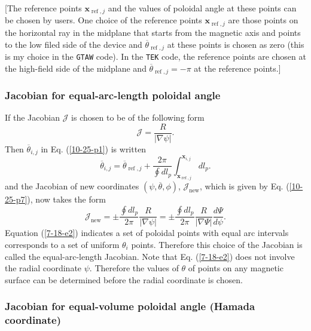 \documentclass{llncs}
\newcommand{\tmop}[1]{\ensuremath{\operatorname{#1}}}
\begin{document}
[The reference points $\mathbf{x}_{\tmop{ref}, j}$ and the values of poloidal
angle at these points can be chosen by users. One choice of the reference
points $\mathbf{x}_{\tmop{ref}, j}$ are those points on the horizontal ray in
the midplane that starts from the magnetic axis and points to the low filed
side of the device and $\overline{\theta}_{\tmop{ref}, j}$ at these points is
chosen as zero (this is my choice in the {\texttt{GTAW}} code). In the
{\texttt{TEK}} code, the reference points are chosen at the high-field side
of the midplane and $\overline{\theta}_{\tmop{ref}, j} = - \pi$ at the
reference points.]

\subsubsection{Jacobian for equal-arc-length poloidal angle}

If the Jacobian $\mathcal{J}$ is chosen to be of the following form
\begin{equation}
  \label{7-18-e1} \mathcal{J}= \frac{R}{| \nabla \psi |} .
\end{equation}
Then $\overline{\theta}_{i, j}$ in Eq. (\ref{10-25-p1}) is written
\begin{equation}
  \label{7-18-e2} \overline{\theta}_{i, j} = \overline{\theta}_{\tmop{ref}, j}
  + \frac{2 \pi}{\oint d l_p} \int_{\mathbf{x}_{\tmop{ref},
  j}}^{\mathbf{x}_{i, j}} d l_p .
\end{equation}
and the Jacobian of new coordinates $(\psi, \overline{\theta}, \phi)$,
$\mathcal{J}_{\tmop{new}}$, which is given by Eq. (\ref{10-25-p7}), now takes
the form
\begin{equation}
  \label{5-14-p1} \mathcal{J}_{\tmop{new}} = \pm \frac{\oint d l_p}{2 \pi} 
  \frac{R}{| \nabla \psi |} = \pm \frac{\oint d l_p}{2 \pi}  \frac{R}{| \nabla
  \Psi |}  \frac{d \Psi}{d \psi} .
\end{equation}
Equation (\ref{7-18-e2}) indicates a set of poloidal points with equal arc
intervals corresponds to a set of uniform $\theta_i$ points. Therefore this
choice of the Jacobian is called the equal-arc-length Jacobian. Note that Eq.
(\ref{7-18-e2}) does not involve the radial coordinate $\psi$. Therefore the
values of $\theta$ of points on any magnetic surface can be determined before
the radial coordinate is chosen.

\subsubsection{Jacobian for equal-volume poloidal angle (Hamada coordinate)}
\end{document}
